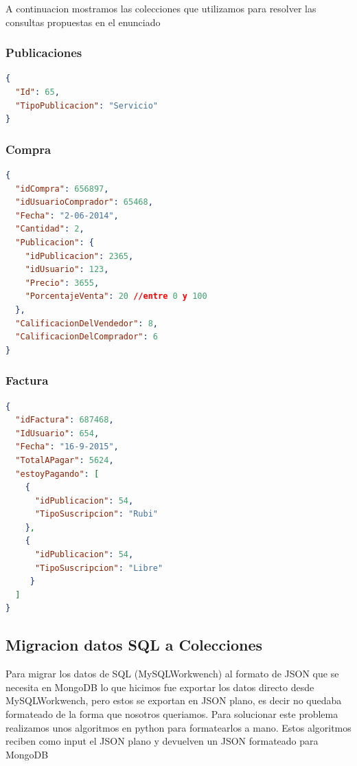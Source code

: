 \documentclass[a4paper, 10pt, twoside]{article}
\begin{document}
A continuacion mostramos las colecciones que utilizamos para resolver las consultas propuestas en el enunciado

\subsubsection{Publicaciones}

\begin{lstlisting}[language=json,firstnumber=1]
{
  "Id": 65,
  "TipoPublicacion": "Servicio"
}
\end{lstlisting}

\subsubsection{Compra}


\begin{lstlisting}[language=json,firstnumber=1]
{
  "idCompra": 656897,
  "idUsuarioComprador": 65468,
  "Fecha": "2-06-2014",
  "Cantidad": 2,
  "Publicacion": {
    "idPublicacion": 2365,
    "idUsuario": 123,
    "Precio": 3655,
    "PorcentajeVenta": 20 //entre 0 y 100
  },
  "CalificacionDelVendedor": 8,
  "CalificacionDelComprador": 6
}
\end{lstlisting}


\subsubsection{Factura}

\begin{lstlisting}[language=json,firstnumber=1]
{
  "idFactura": 687468,
  "IdUsuario": 654,
  "Fecha": "16-9-2015",
  "TotalAPagar": 5624,
  "estoyPagando": [
    {
      "idPublicacion": 54,
      "TipoSuscripcion": "Rubi"
    },
    {
      "idPublicacion": 54,
      "TipoSuscripcion": "Libre"
     }
  ]
}
\end{lstlisting}
\newpage
\subsection{Migracion datos SQL a Colecciones}
Para migrar los datos de SQL (MySQLWorkwench) al formato de JSON que se necesita en MongoDB lo que hicimos fue exportar los datos directo desde MySQLWorkwench, pero estos se exportan en JSON plano, es decir no quedaba formateado de la forma que nosotros queriamos. 
Para solucionar este problema realizamos unos algoritmos en python para formatearlos a mano. Estos algoritmos reciben como input el JSON plano y devuelven un JSON formateado para MongoDB
\end{document}
